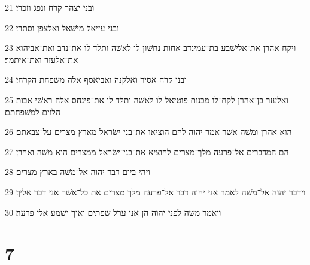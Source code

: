 \par 21 ובני יצהר קרח ונפג וזכרי׃
\par 22 ובני עזיאל מישׁאל ואלצפן וסתרי׃
\par 23 ויקח אהרן את־אלישׁבע בת־עמינדב אחות נחשׁון לו לאשׁה ותלד לו את־נדב ואת־אביהוא את־אלעזר ואת־איתמר׃
\par 24 ובני קרח אסיר ואלקנה ואביאסף אלה משׁפחת הקרחי׃
\par 25 ואלעזר בן־אהרן לקח־לו מבנות פוטיאל לו לאשׁה ותלד לו את־פינחס אלה ראשׁי אבות הלוים למשׁפחתם׃
\par 26 הוא אהרן ומשׁה אשׁר אמר יהוה להם הוציאו את־בני ישׂראל מארץ מצרים על־צבאתם׃
\par 27 הם המדברים אל־פרעה מלך־מצרים להוציא את־בני־ישׂראל ממצרים הוא משׁה ואהרן׃
\par 28 ויהי ביום דבר יהוה אל־משׁה בארץ מצרים׃
\par 29 וידבר יהוה אל־משׁה לאמר אני יהוה דבר אל־פרעה מלך מצרים את כל־אשׁר אני דבר אליך׃
\par 30 ויאמר משׁה לפני יהוה הן אני ערל שׂפתים ואיך ישׁמע אלי פרעה׃

\chapter{7}

